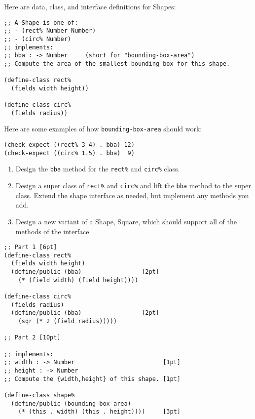 \documentclass[12pt]{article}                   %
\def\pts#1{\marginpar{\footnotesize \raggedright  \fbox{#1 {\sc Points}}}}
\newenvironment{solution}{}{}
\newcommand\code[1]{\texttt{#1}}
\begin{document}
\begin{problem}\pts{18}

Here are data, class, and interface definitions for Shapes:
\begin{verbatim}
;; A Shape is one of:
;; - (rect% Number Number)
;; - (circ% Number)
;; implements:
;; bba : -> Number     (short for "bounding-box-area")
;; Compute the area of the smallest bounding box for this shape.

(define-class rect%
  (fields width height))

(define-class circ%
  (fields radius))
\end{verbatim}
%
Here are some examples of how \code{bounding-box-area} should work:
\begin{verbatim}
(check-expect ((rect% 3 4) . bba) 12)
(check-expect ((circ% 1.5) . bba)  9)
\end{verbatim}


\begin{enumerate}
\item Design the \code{bba} method for the
  \code{rect\%} and \code{circ\%} class.

\item Design a super class of \code{rect\%} and \code{circ\%} and
  lift the \code{bba} method to the super class.  Extend
  the shape interface as needed, but implement any methods you add.

\item Design a new variant of a Shape, Square, which should support
  all of the methods of the interface.
\end{enumerate}

\begin{solution}
\begin{verbatim}
;; Part 1 [6pt]
(define-class rect% 
  (fields width height)                
  (define/public (bba)                 [2pt]
    (* (field width) (field height))))
  
(define-class circ% 
  (fields radius)                      
  (define/public (bba)                 [2pt]
    (sqr (* 2 (field radius)))))

;; Part 2 [10pt]

;; implements:
;; width : -> Number                         [1pt]
;; height : -> Number
;; Compute the {width,height} of this shape. [1pt]

(define-class shape% 
  (define/public (bounding-box-area)
    (* (this . width) (this . height))))     [3pt]


\end{verbatim}
\end{solution}
\end{problem}
\end{document}

